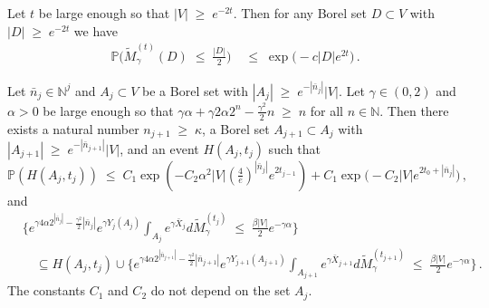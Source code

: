 \documentclass[10pt,a4paper]{amsart}
\newcommand{\N}{\mathbb{N}}
\newcommand{\Pb}{\P}
\newcommand{\ab}{|}
\newcommand{\grea}{>}
\renewcommand{\P}{\mathbb{P}}
\renewcommand{\geq}{\;\geqslant\;}                   %
\renewcommand{\leq}{\;\leqslant\;}                   %
\renewcommand{\tilde}{\widetilde}          %
\begin{document}
\begin{lemma}\label{concentration}
Let $t$ be large enough so that $\ab V \ab \geq e^{-2t}$. Then for any Borel set $D \subset V$ with $\ab D \ab \geq e^{-2t}$ we have 
\begin{align*}
\P\big( \tilde M_{\gamma}^{(t)}(D) \leq \tfrac{\ab D \ab}{2} \big) &\leq  \exp \big( - c \ab D \ab e^{2t} \big)\,.
\end{align*}
\end{lemma}

\begin{lemma}\label{iteration}
Let $\bar n_j \in \N^{j}$ and $A_j \subset V$ be a Borel set with $\ab A_j \ab \geq e^{-\ab \bar n_j \ab } \ab V \ab $. Let $\gamma \in (0,2)$ and $\alpha \grea 0$ be large enough so that $\gamma \alpha + \gamma 2 \alpha 2^n - \frac{\gamma^2}{2} n \geq n$ for all $n \in \N$. Then there exists a natural number $n_{j+1} \geq \kappa$, a  Borel set $A_{j+1} \subset A_j$ with $\ab A_{j+1} \ab \geq e^{- \ab \bar n_{j+1} \ab} \ab V \ab$, and an event $H(A_j,t_j)$ such that 
\[
  \Pb (H(A_j,t_j)) \leq C_1 \exp(-C_2 \alpha^2 \ab V \ab  (\tfrac{4}{e})^{| \bar n_j|} e^{2t_{j-1}}) +  C_1 \exp \big( -C_2 \ab V \ab  e^{2 t_0 + | \bar n_{j}|} \big) \,,
  \]
  and
\begin{align*}
  & \{ e^{\gamma 4\alpha 2^{| \bar n_{j} | }  - \frac{\gamma^2}{2} |\bar n_{j}| } e^{\gamma Y_{j}(A_j)}\int_{A_{j}} e^{\gamma \bar X_{j}} d \tilde M_\gamma^{(t_{j})} \leq \tfrac{\beta \ab V \ab }{2} e^{-\gamma \alpha}\}  \\
    &\quad \subseteq H(A_j,t_j) \cup  \{ e^{\gamma 4 \alpha 2^{| \bar n_{j+1} | }  - \frac{\gamma^2}{2} |\bar n_{j+1}| } e^{\gamma Y_{j+1}(A_{j+1})}\int_{A_{j+1}} e^{\gamma \bar X_{j+1}} d \tilde M_\gamma^{(t_{j+1})}\leq \tfrac{\beta \ab V \ab }{2} e^{-\gamma \alpha} \}\,.
  \end{align*}
The constants $C_1$ and $C_2$ do not depend on the set $A_j$.

\end{lemma}
\end{document}
